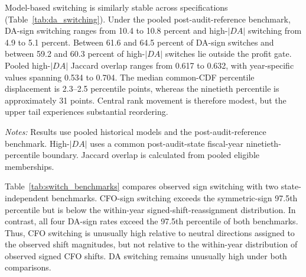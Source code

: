 Model-based switching is similarly stable across specifications (Table~\ref{tab:da_switching}). Under the pooled post-audit-reference benchmark, DA-sign switching ranges from 10.4 to 10.8 percent and high-$|DA|$ switching from 4.9 to 5.1 percent. Between 61.6 and 64.5 percent of DA-sign switches and between 59.2 and 60.3 percent of high-$|DA|$ switches lie outside the profit gate. Pooled high-$|DA|$ Jaccard overlap ranges from 0.617 to 0.632, with year-specific values spanning 0.534 to 0.704. The median common-CDF percentile displacement is 2.3--2.5 percentile points, whereas the ninetieth percentile is approximately 31 points. Central rank movement is therefore modest, but the upper tail experiences substantial reordering.

\begin{table}[htbp]
\centering
\caption{Discretionary-accrual switching across model families}
\label{tab:da_switching}
\scriptsize
{}
\begin{minipage}{0.97\textwidth}\footnotesize
\textit{Notes:} Results use pooled historical models and the post-audit-reference benchmark. High-$|DA|$ uses a common post-audit-state fiscal-year ninetieth-percentile boundary. Jaccard overlap is calculated from pooled eligible memberships.
\end{minipage}
\end{table}

Table~\ref{tab:switch_benchmarks} compares observed sign switching with two state-independent benchmarks. CFO-sign switching exceeds the symmetric-sign 97.5th percentile but is below the within-year signed-shift-reassignment distribution. In contrast, all four DA-sign rates exceed the 97.5th percentile of both benchmarks. Thus, CFO switching is unusually high relative to neutral directions assigned to the observed shift magnitudes, but not relative to the within-year distribution of observed signed CFO shifts. DA switching remains unusually high under both comparisons.

